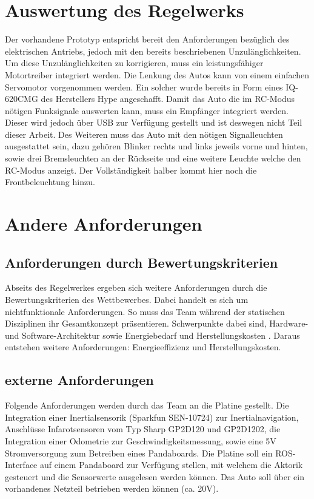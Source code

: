 \section{Auswertung des Regelwerks}
Der vorhandene Prototyp entspricht bereit den Anforderungen bezüglich des elektrischen Antriebs, jedoch mit den bereits beschriebenen Unzulänglichkeiten. 
Um diese Unzulänglichkeiten zu korrigieren, muss ein leistungsfähiger Motortreiber integriert werden.
Die Lenkung des Autos kann von einem einfachen Servomotor vorgenommen werden. Ein solcher wurde bereits in Form eines IQ-620CMG des Herstellers Hype angeschafft. 
Damit das Auto die im RC-Modus nötigen Funksignale auswerten kann, muss ein Empfänger integriert werden. Dieser wird jedoch über USB zur Verfügung gestellt
und ist deswegen nicht Teil dieser Arbeit. Des Weiteren muss das Auto mit den nötigen Signalleuchten ausgestattet sein, dazu gehören Blinker rechts und links
jeweils vorne und hinten, sowie drei Bremsleuchten an der Rückseite und eine weitere Leuchte welche den RC-Modus anzeigt. Der Vollständigkeit halber kommt hier noch die
Frontbeleuchtung hinzu.

\section{Andere Anforderungen}
\subsection{Anforderungen durch Bewertungskriterien}
Abseits des Regelwerkes ergeben sich weitere Anforderungen durch die Bewertungskriterien des Wettbewerbes. Dabei handelt es sich um nichtfunktionale Anforderungen.
So muss das Team während der statischen Disziplinen ihr Gesamtkonzept präsentieren. Schwerpunkte dabei sind, Hardware- und Software-Architektur sowie Energiebedarf und 
Herstellungskosten \cite{website-carolo-cup-regelwerk}. Daraus entstehen weitere Anforderungen: Energieeffizienz und Herstellungskosten. \\


\subsection{externe Anforderungen}
Folgende Anforderungen werden durch das Team an die Platine gestellt. Die Integration einer Inertialsensorik (Sparkfun SEN-10724) zur Inertialnavigation,
Anschlüsse Infarotsensoren vom Typ Sharp GP2D120 und GP2D1202, die Integration einer Odometrie zur Geschwindigkeitsmessung,
sowie eine 5V Stromversorgung zum Betreiben eines Pandaboards. Die Platine soll ein ROS-Interface auf einem Pandaboard zur Verfügung stellen, mit welchem die Aktorik gesteuert und
die Sensorwerte ausgelesen werden können. Das Auto soll über ein vorhandenes Netzteil betrieben werden können (ca. 20V).\\

